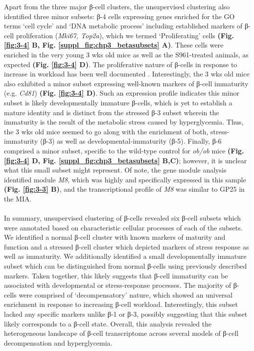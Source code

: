 Apart from the three major β-cell clusters, the unsupervised clustering also identified three minor subsets: β-4 cells expressing genes enriched for the GO terms `cell cycle’ and `DNA metabolic process’ including established markers of β-cell proliferation (\textit{Mki67, Top2a}), which we termed ‘Proliferating’ cells \textbf{(Fig. \ref{fig:3-4} B, Fig. \ref{suppl_fig:chp3_betasubsets} A)}. These cells were enriched in the very young 3 wks old mice as well as the S961-treated animals, as expected \textbf{(Fig. \ref{fig:3-4} D)}. The proliferative nature of β-cells in response to increase in workload has been well documented \textbf{\cite{}}. Interestingly, the 3 wks old mice also exhibited a minor subset expressing well-known markers of β-cell immaturity (e.g. \textit{Cd81}) \textbf{(Fig. \ref{fig:3-4} D)}. Such an expression profile indicates this minor subset is likely developmentally immature β-cells, which is yet to establish a mature identity and is distinct from the stressed β-3 subset wherein the immaturity is the result of the metabolic stress caused by hyperglycemia. Thus, the 3 wks old mice seemed to go along with the enrichment of both, stress-immaturity (β-3) as well as developmental-immaturity (β-5). Finally, β-6 comprised a minor subset, specific to the wild-type control for \textit{ob/ob} mice \textbf{(Fig. \ref{fig:3-4} D, Fig. \ref{suppl_fig:chp3_betasubsets} B,C)}; however, it is unclear what this small subset might represent. Of note, the gene module analysis identified module \textit{M8}, which was highly and specifically expressed in this sample \textbf{(Fig. \ref{fig:3-3} B)}, and the transcriptional profile of \textit{M8} was similar to GP25 in the MIA.\\\\

In summary, unsupervised clustering of β-cells revealed six β-cell subsets which were annotated based on characteristic cellular processes of each of the subsets. We identified a normal β-cell cluster with known markers of maturity and function and a stressed β-cell cluster which depicted markers of stress response as well as immaturity. We additionally identified a small developmentally immature subset which can be distinguished from normal β-cells using previously described markers. Taken together, this likely suggests that β-cell immaturity can be associated with developmental or stress-response processes. The majority of β-cells were comprised of `decompensatory' nature, which showed an universal enrichment in response to increasing β-cell workload. Interestingly, this subset lacked any specific markers unlike β-1 or β-3, possibly suggesting that this subset likely corresponds to a β-cell state. Overall, this analysis revealed the heterogeneous landscape of β-cell transcriptome across several models of β-cell decompensation and hyperglycemia. 

